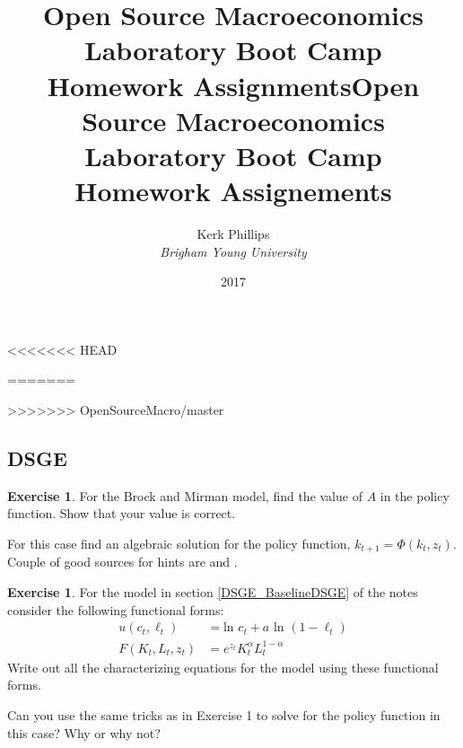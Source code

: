 \documentclass[letterpaper,12pt]{article}
\theoremstyle{definition}
\newtheorem{exercise}[theorem]{Exercise}
\begin{document}
\begin{titlepage}
<<<<<<< HEAD
	\title{Open Source Macroeconomics Laboratory Boot Camp \\ Homework Assignments}  %
=======
	\title{Open Source Macroeconomics Laboratory Boot Camp \\ Homework Assignements}  %
>>>>>>> OpenSourceMacro/master
	\author{Kerk Phillips\\ \emph{Brigham Young University}}
	\date{\LARGE{2017}}
	\maketitle
\end{titlepage}

\begin{spacing}{1.5}


\section*{DSGE}\label{DSGE_HW}

	\begin{exercise} \label{DSGE_HW_BM_FindA}
		For the Brock and Mirman model, find the value of $A$ in the policy function.  Show that your value is correct.

		For this case find an algebraic solution for the policy function, $k_{t+1} = \Phi (k_t,z_t)$.  Couple of good sources for hints are \citet[exercise 2.2, p. 12]{StokeyLucas1989} and \citet[exercise 1.1, p. 47]{Sargent1987}.
	\end{exercise}

	\begin{exercise} \label{DSGE_HW_CharEq_Ln}
		For the model in section \ref{DSGE_BaselineDSGE} of the notes consider the following functional forms:
		\begin{equation}\label{DSGE_HW_CharEq_Ln_eq01}
		\begin{split}
		u(c_t,\ell_t) & = \text{ln }c_t + a \text{ ln }(1-\ell_t)\\
		F(K_t,L_t,z_t) & = e^{z_t}K^{\alpha}_t L^{1-\alpha}_t  \nonumber
		\end{split}
		\end{equation}
		Write out all the characterizing equations for the model using these functional forms.

		Can you use the same tricks as in Exercise 1 to solve for the policy function in this case?  Why or why not?
	\end{exercise}


\end{spacing}
\end{document}
